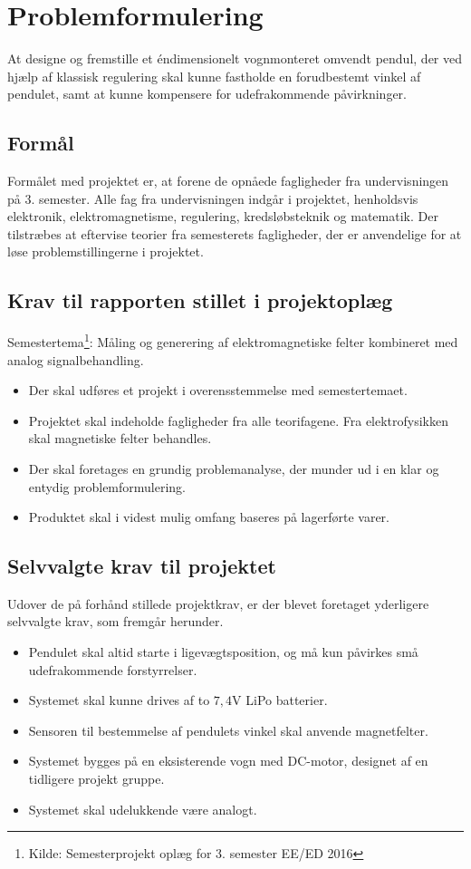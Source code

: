 
\section{Problemformulering}
At designe og fremstille et éndimensionelt vognmonteret omvendt pendul, der ved hjælp af klassisk regulering skal kunne fastholde en forudbestemt vinkel af pendulet, samt at kunne kompensere for udefrakommende påvirkninger. 

\subsection{Formål}
Formålet med projektet er, at forene de opnåede fagligheder fra undervisningen på 3. semester. 
Alle fag fra undervisningen indgår i projektet, henholdsvis elektronik, elektromagnetisme, regulering, kredsløbsteknik og matematik.
Der tilstræbes at eftervise teorier fra semesterets fagligheder, der er anvendelige for at løse problemstillingerne i projektet. 


\subsection{Krav til rapporten stillet i projektoplæg}
Semestertema\footnote{Kilde: Semesterprojekt oplæg for 3. semester EE/ED 2016}: Måling og generering af elektromagnetiske felter kombineret med analog signalbehandling.
\begin{itemize}
\item Der skal udføres et projekt i overensstemmelse med semestertemaet.
\item Projektet skal indeholde fagligheder fra alle teorifagene. Fra elektrofysikken skal
magnetiske felter behandles.
\item Der skal foretages en grundig problemanalyse, der munder ud i en klar og entydig
problemformulering.
\item Produktet skal i videst mulig omfang baseres på lagerførte varer.
\end{itemize}

\subsection{Selvvalgte krav til projektet} \label{afs:kravspecifikation}
Udover de på forhånd stillede projektkrav, er der blevet foretaget yderligere selvvalgte krav, som fremgår herunder.
\begin{itemize}
\item Pendulet skal altid starte i ligevægtsposition, og må kun påvirkes små udefrakommende forstyrrelser.
\item Systemet skal kunne drives af to $7,4\si{\volt}$ LiPo batterier.
\item Sensoren til bestemmelse af pendulets vinkel skal anvende magnetfelter.
\item Systemet bygges på en eksisterende vogn med DC-motor, designet af en tidligere projekt gruppe. 
\item Systemet skal udelukkende være analogt. 
\end{itemize}


